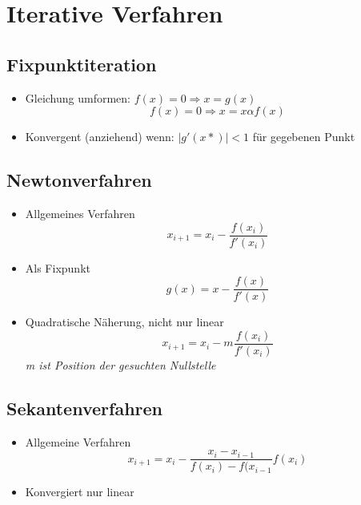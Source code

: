 \section{Iterative Verfahren}

\subsection{Fixpunktiteration}
\begin{itemize}

	\item Gleichung umformen: $f(x) = 0 \Rightarrow x = g(x)$\\
	\begin{equation*}
		f(x) = 0 \Rightarrow x = x \alpha f(x)
	\end{equation*}
	
	\item Konvergent (anziehend) wenn: $|g'(x*)| < 1$ für gegebenen Punkt\\

\end{itemize}

\subsection{Newtonverfahren}
\begin{itemize}

	\item Allgemeines Verfahren
	\begin{equation*}
		x_{i+1} = x_i - \frac{f(x_i)}{f'(x_i)}
	\end{equation*}
	
	\item Als Fixpunkt
	\begin{equation*}
		g(x) = x - \frac{f(x)}{f'(x)}
	\end{equation*}
	
	\item Quadratische Näherung, nicht nur linear
	\begin{equation*}
		x_{i+1} = x_i - m \frac{f(x_i)}{f'(x_i)}
	\end{equation*}
	\textit{m ist Position der gesuchten Nullstelle}

\end{itemize}

\subsection{Sekantenverfahren}
\begin{itemize}

	\item Allgemeine Verfahren
	\begin{equation*}
		x_{i+1} = x_i - \frac{x_i - x_{i-1}}{f(x_i) - f(x_{i-1}} f(x_i)
	\end{equation*}
	
	\item Konvergiert nur linear

\end{itemize}

